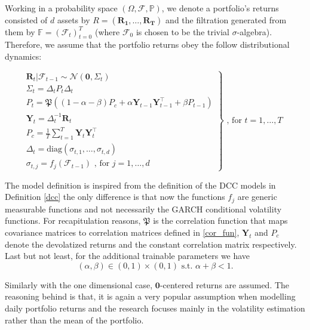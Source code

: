 \documentclass[a4paper, oneside]{discothesis}
\begin{document}
\begin{assumption}
Working in a probability space $(\Omega, \mathcal{F}, \mathbb{P})$, we denote a portfolio's returns consisted of $d$ assets by $R = (\mathbf{R_1}, \dots, \mathbf{R_T})$ and the filtration generated from them by $\mathbb{F} = (\mathcal{F}_t)_{t=0}^T$ (where $\mathcal{F}_0$ is chosen to be the trivial $\sigma$-algebra). Therefore, we assume that the portfolio returns obey the follow distributional dynamics:

\begin{equation}\label{dynamics_md}
\left.
    \begin{matrix}
        \mathbf{R}_t|\mathcal{F}_{t-1} \sim \mathcal{N}\left(\mathbf{0}, \Sigma_t\right)\\ 
        \Sigma_t = \Delta_t P_t \Delta_t \\
        P_t = \mathfrak{P}\left( \left(1-\alpha -  \beta \right)P_c+\alpha\mathbf{Y}_{t-1}\mathbf{Y}_{t-1}^\intercal + \beta P_{t-1}\right) \\ 
        \mathbf{Y}_t = \Delta_t^{-1}\mathbf{R}_t\\
        P_c = \frac{1}{T}\sum_{t=1}^T \mathbf{Y}_t\mathbf{Y}_t^\intercal\\
        \Delta_t = \text{diag}(\sigma_{t,1}, \dots, \sigma_{t,d}) \\ 
        \sigma_{t,j} = f_j(\mathcal{F}_{t-1})\text{     , for $j = 1, \dots, d$}
    \end{matrix}       \right\} \text{     , for $t=1, \dots, T$ }
\end{equation}
\end{assumption}

The model definition is inspired from the definition of the DCC models in Definition \ref{dcc} the only difference is that now the functions $f_j$ are generic measurable functions and not necessarily the GARCH conditional volatility functions. For recapitulation reasons, $\mathfrak{P}$ is the correlation function that maps covariance matrices to correlation matrices defined in \ref{cor_fun}, $\mathbf{Y}_t$ and $P_c$ denote the devolatized returns and the constant correlation matrix respectively. Last but not least, for the additional trainable parameters we have \[(\alpha, \beta)\in (0,1)\times (0,1)\text{     s.t. } \alpha+\beta<1.\]

Similarly with the one dimensional case, $\mathbf{0}$-centered returns are assumed. The reasoning behind is that, it is again a very popular assumption when modelling daily portfolio returns and the research focuses mainly in the volatility estimation rather than the mean of the portfolio.
\end{document}

